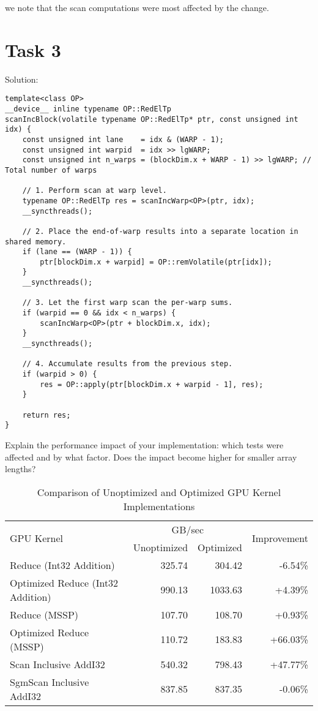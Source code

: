 \documentclass{article}
\begin{document}
  we note that the scan computations were most affected by the change.

\section{Task 3}

Solution:

\begin{lstlisting}[language=cuda]
template<class OP>
__device__ inline typename OP::RedElTp
scanIncBlock(volatile typename OP::RedElTp* ptr, const unsigned int idx) {
    const unsigned int lane    = idx & (WARP - 1);
    const unsigned int warpid  = idx >> lgWARP;
    const unsigned int n_warps = (blockDim.x + WARP - 1) >> lgWARP; // Total number of warps

    // 1. Perform scan at warp level.
    typename OP::RedElTp res = scanIncWarp<OP>(ptr, idx);
    __syncthreads();

    // 2. Place the end-of-warp results into a separate location in shared memory.
    if (lane == (WARP - 1)) {
        ptr[blockDim.x + warpid] = OP::remVolatile(ptr[idx]);
    }
    __syncthreads();

    // 3. Let the first warp scan the per-warp sums.
    if (warpid == 0 && idx < n_warps) {
        scanIncWarp<OP>(ptr + blockDim.x, idx);
    }
    __syncthreads();

    // 4. Accumulate results from the previous step.
    if (warpid > 0) {
        res = OP::apply(ptr[blockDim.x + warpid - 1], res);
    }

    return res;
}
\end{lstlisting}

Explain the performance impact of your implementation: which tests were affected and by what factor. Does the impact become higher for smaller array lengths?
\begin{table}[h]
  \centering
  \begin{tabular}{|l|r|r|r|}
  \hline
  \multirow{2}{*}{GPU Kernel} & \multicolumn{2}{c|}{GB/sec} & \multirow{2}{*}{Improvement} \\
  \cline{2-3}
   & Unoptimized & Optimized & \\
  \hline
  Reduce (Int32 Addition) & 325.74 & 304.42 & -6.54\% \\
  \hline
  Optimized Reduce (Int32 Addition) & 990.13 & 1033.63 & +4.39\% \\
  \hline
  Reduce (MSSP) & 107.70 & 108.70 & +0.93\% \\
  \hline
  Optimized Reduce (MSSP) & 110.72 & 183.83 & +66.03\% \\
  \hline
  Scan Inclusive AddI32 & 540.32 & 798.43 & +47.77\% \\
  \hline
  SgmScan Inclusive AddI32 & 837.85 & 837.35 & -0.06\% \\
  \hline
  \end{tabular}
  \caption{Comparison of Unoptimized and Optimized GPU Kernel Implementations}
  \label{tab:gpu-kernel-comparison}
\end{table}
\end{document}
